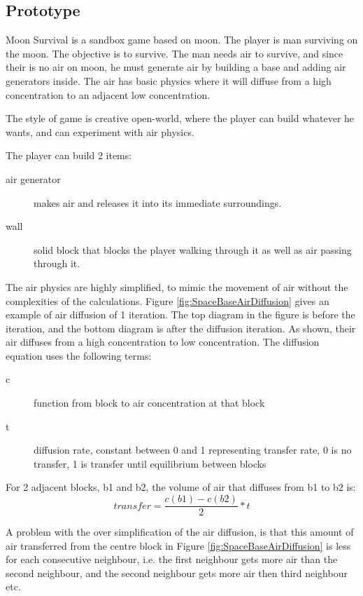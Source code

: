 \subsection{\prototypeSiddall Prototype}


Moon Survival is a sandbox game based on moon.
The player is man surviving on the moon.
The objective is to survive.
The man needs air to survive, and since their is no air on moon, he must generate air by building a base and adding air generators inside.
The air has basic physics where it will diffuse from a high concentration to an adjacent low concentration.

The style of game is creative open-world, where the player can build whatever he wants, and can experiment with air physics.

The player can build 2 items: 
\begin{description}
\item[air generator] makes air and releases it into its immediate surroundings. 
\item[wall] solid block that blocks the player walking through it as well as air passing through it.
\end{description}

The air physics are highly simplified, to mimic the movement of air without the complexities of the calculations.
Figure \ref{fig:SpaceBaseAirDiffusion} gives an example of air diffusion of 1 iteration. The top diagram in the figure is before the iteration, and the bottom diagram is after the diffusion iteration.
As shown, their air diffuses from a high concentration to low concentration.
The diffusion equation uses the following terms:
\begin{description}
\item[c] function from block to air concentration at that block
\item[t] diffusion rate, constant between 0 and 1 representing transfer rate, 0 is no transfer, 1 is transfer until equilibrium between blocks
\end{description}

For 2 adjacent blocks, b1 and b2, the volume of air that diffuses from b1 to b2 is:
$$ transfer = \frac{c(b1) - c(b2)}{2} * t $$

A problem with the over simplification of the air diffusion, is that this amount of air transferred from the centre block in Figure \ref{fig:SpaceBaseAirDiffusion} is less for each consecutive neighbour, i.e. the first neighbour gets more air than the second neighbour, and the second neighbour gets more air then third neighbour etc.

